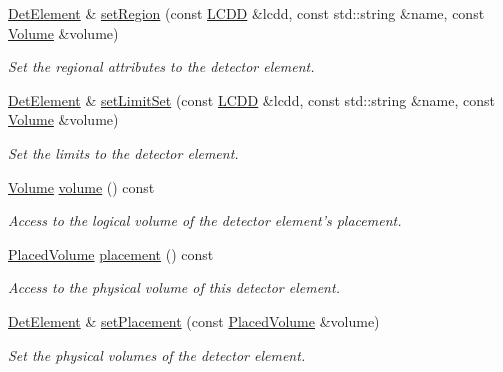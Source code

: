 \begin{DoxyCompactItemize}
\hyperlink{class_d_d4hep_1_1_geometry_1_1_det_element}{DetElement} \& \hyperlink{class_d_d4hep_1_1_geometry_1_1_det_element_a428b67df7bca888c0b08e49a0de0eb37}{setRegion} (const \hyperlink{class_d_d4hep_1_1_geometry_1_1_l_c_d_d}{LCDD} \&lcdd, const std::string \&name, const \hyperlink{class_d_d4hep_1_1_geometry_1_1_volume}{Volume} \&volume)
\begin{DoxyCompactList}\small\item\em Set the regional attributes to the detector element. \item\end{DoxyCompactList}\item 
\hyperlink{class_d_d4hep_1_1_geometry_1_1_det_element}{DetElement} \& \hyperlink{class_d_d4hep_1_1_geometry_1_1_det_element_a3d49a91bfb52e81ce87f891ea5394c98}{setLimitSet} (const \hyperlink{class_d_d4hep_1_1_geometry_1_1_l_c_d_d}{LCDD} \&lcdd, const std::string \&name, const \hyperlink{class_d_d4hep_1_1_geometry_1_1_volume}{Volume} \&volume)
\begin{DoxyCompactList}\small\item\em Set the limits to the detector element. \item\end{DoxyCompactList}\item 
\hyperlink{class_d_d4hep_1_1_geometry_1_1_volume}{Volume} \hyperlink{class_d_d4hep_1_1_geometry_1_1_det_element_a32d26062edede5aad146b6dbe3eef5be}{volume} () const 
\begin{DoxyCompactList}\small\item\em Access to the logical volume of the detector element's placement. \item\end{DoxyCompactList}\item 
\hyperlink{class_d_d4hep_1_1_geometry_1_1_placed_volume}{PlacedVolume} \hyperlink{class_d_d4hep_1_1_geometry_1_1_det_element_a32a39fbab7eeb59dd4ad2fc807e0b66d}{placement} () const 
\begin{DoxyCompactList}\small\item\em Access to the physical volume of this detector element. \item\end{DoxyCompactList}\item 
\hyperlink{class_d_d4hep_1_1_geometry_1_1_det_element}{DetElement} \& \hyperlink{class_d_d4hep_1_1_geometry_1_1_det_element_a18640f84168adced73afd4eb2b84a798}{setPlacement} (const \hyperlink{class_d_d4hep_1_1_geometry_1_1_placed_volume}{PlacedVolume} \&volume)
\begin{DoxyCompactList}\small\item\em Set the physical volumes of the detector element. \item\end{DoxyCompactList}\item 

\end{DoxyCompactItemize}

